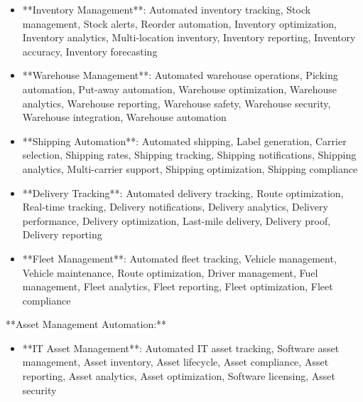 \documentclass[11pt,a4paper]{article}
\begin{document}
\begin{itemize}
\item **Inventory Management**: Automated inventory tracking, Stock management, Stock alerts, Reorder automation, Inventory optimization, Inventory analytics, Multi-location inventory, Inventory reporting, Inventory accuracy, Inventory forecasting
\end{itemize}

\begin{itemize}
\item **Warehouse Management**: Automated warehouse operations, Picking automation, Put-away automation, Warehouse optimization, Warehouse analytics, Warehouse reporting, Warehouse safety, Warehouse security, Warehouse integration, Warehouse automation
\end{itemize}

\begin{itemize}
\item **Shipping Automation**: Automated shipping, Label generation, Carrier selection, Shipping rates, Shipping tracking, Shipping notifications, Shipping analytics, Multi-carrier support, Shipping optimization, Shipping compliance
\end{itemize}

\begin{itemize}
\item **Delivery Tracking**: Automated delivery tracking, Route optimization, Real-time tracking, Delivery notifications, Delivery analytics, Delivery performance, Delivery optimization, Last-mile delivery, Delivery proof, Delivery reporting
\end{itemize}

\begin{itemize}
\item **Fleet Management**: Automated fleet tracking, Vehicle management, Vehicle maintenance, Route optimization, Driver management, Fuel management, Fleet analytics, Fleet reporting, Fleet optimization, Fleet compliance
\end{itemize}

**Asset Management Automation:**

\begin{itemize}
\item **IT Asset Management**: Automated IT asset tracking, Software asset management, Asset inventory, Asset lifecycle, Asset compliance, Asset reporting, Asset analytics, Asset optimization, Software licensing, Asset security
\end{itemize}
\end{document}
